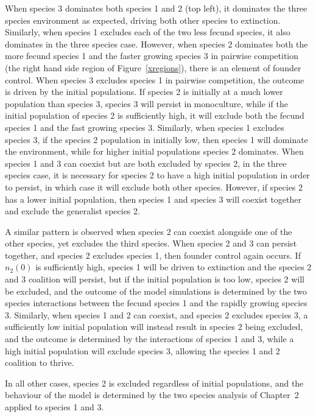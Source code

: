 When species 3 dominates both species 1 and 2 (top left), it dominates the three species environment as expected, driving both other species to extinction. Similarly, when species 1 excludes each of the two less fecund species, it also dominates in the three species case. However, when species 2 dominates both the more fecund species 1 and the faster growing species 3 in pairwise competition (the right hand side region of Figure~\ref{xregions}), there is an element of founder control. When species 3 excludes species 1 in pairwise competition, the outcome is driven by the initial populations. If species 2 is initially at a much lower population than species 3, species 3 will persist in monoculture, while if the initial population of species 2 is sufficiently high, it will exclude both the fecund species 1 and the fast growing species 3. Similarly, when species 1 excludes species 3, if the species 2 population in initially low, then species 1 will dominate the environment, while for higher initial populations species 2 dominates. When species 1 and 3 can coexist but are both excluded by species 2, in the three species case, it is necessary for species 2 to have a high initial population in order to persist, in which case it will exclude both other species. However, if species 2 has a lower initial population, then species 1 and species 3 will coexist together and exclude the generalist species 2.

A similar pattern is observed when species 2 can coexist alongside one of the other species, yet excludes the third species. When species 2 and 3 can persist together, and species 2 excludes species 1, then founder control again occurs. If $n_2(0)$ is sufficiently high, species 1 will be driven to extinction and the species 2 and 3 coalition will persist, but if the initial population is too low, species 2 will be excluded, and the outcome of the model simulations is determined by the two species interactions between the fecund species 1 and the rapidly growing species 3. Similarly, when species 1 and 2 can coexist, and species 2 excludes species 3, a sufficiently low initial population will instead result in species 2 being excluded, and the outcome is determined by the interactions of species 1 and 3, while a high initial population will exclude species 3, allowing the species 1 and 2 coalition to thrive.

In all other cases, species 2 is excluded regardless of initial populations, and the behaviour of the model is determined by the two species analysis of Chapter~2 applied to species 1 and 3.

